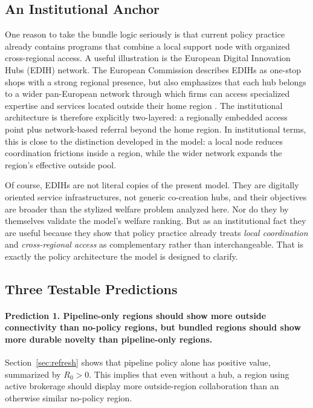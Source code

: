 \subsection{An Institutional Anchor}

One reason to take the bundle logic seriously is that current policy practice already contains programs that combine a local support node with organized cross-regional access. A useful illustration is the European Digital Innovation Hubs (EDIH) network. The European Commission describes EDIHs as one-stop shops with a strong regional presence, but also emphasizes that each hub belongs to a wider pan-European network through which firms can access specialized expertise and services located outside their home region \citep{EuropeanCommission2025EDIH}. The institutional architecture is therefore explicitly two-layered: a regionally embedded access point plus network-based referral beyond the home region. In institutional terms, this is close to the distinction developed in the model: a local node reduces coordination frictions inside a region, while the wider network expands the region's effective outside pool.

Of course, EDIHs are not literal copies of the present model. They are digitally oriented service infrastructures, not generic co-creation hubs, and their objectives are broader than the stylized welfare problem analyzed here. Nor do they by themselves validate the model's welfare ranking. But as an institutional fact they are useful because they show that policy practice already treats \emph{local coordination} and \emph{cross-regional access} as complementary rather than interchangeable. That is exactly the policy architecture the model is designed to clarify.

\subsection{Three Testable Predictions}

\paragraph{Prediction 1. Pipeline-only regions should show more outside connectivity than no-policy regions, but bundled regions should show more durable novelty than pipeline-only regions.}

Section~\ref{sec:refresh} shows that pipeline policy alone has positive value, summarized by $R_0>0$. This implies that even without a hub, a region using active brokerage should display more outside-region collaboration than an otherwise similar no-policy region.

